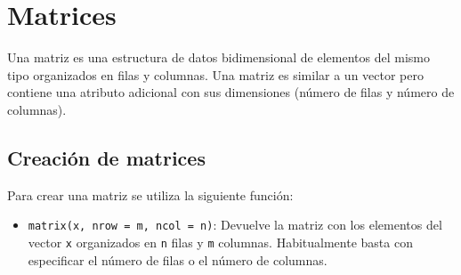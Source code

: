 \documentclass[
  spanish,
  a4paper,
]{scrreport}
\providecommand{\tightlist}{%
  \setlength{\itemsep}{0pt}\setlength{\parskip}{0pt}}
\theoremstyle{definition}
\theoremstyle{definition}
\theoremstyle{remark}
\begin{document}
\section{Matrices}\label{matrices}

Una matriz es una estructura de datos bidimensional de elementos del
mismo tipo organizados en filas y columnas. Una matriz es similar a un
vector pero contiene una atributo adicional con sus dimensiones (número
de filas y número de columnas).

\subsection{Creación de matrices}\label{creaciuxf3n-de-matrices}

Para crear una matriz se utiliza la siguiente función:

\begin{itemize}
\tightlist
\item
  \texttt{matrix(x,\ nrow\ =\ m,\ ncol\ =\ n)}: Devuelve la matriz con
  los elementos del vector \texttt{x} organizados en \texttt{n} filas y
  \texttt{m} columnas. Habitualmente basta con especificar el número de
  filas o el número de columnas.
\end{itemize}
\end{document}

